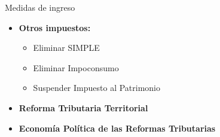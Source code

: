 \begin{frame}{Medidas de ingreso}
    \begin{itemize}
        \item \textbf{Otros impuestos:}         \begin{itemize}
            \item Eliminar SIMPLE
            \item Eliminar Impoconsumo
            \item Suspender Impuesto al Patrimonio
        \end{itemize} 
        \item \textbf{Reforma Tributaria Territorial}
        \item \textbf{Economía Política de las Reformas Tributarias}
    \end{itemize}
\end{frame}
